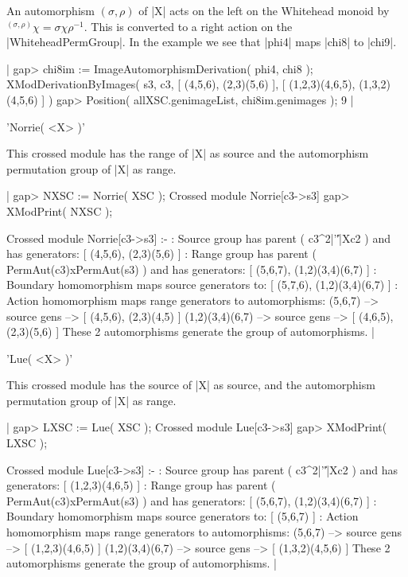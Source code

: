 {An automorphism $( \sigma, \rho )$ of |X| acts on the left on the Whitehead 
monoid by  $\mbox{}^{(\sigma,\rho)}\chi = \sigma \chi \rho^{-1}$.
This is converted to a right action on the |WhiteheadPermGroup|.
In the example we see that |phi4| maps |chi8| to |chi9|.

|    gap> chi8im := ImageAutomorphismDerivation( phi4, chi8 );
    XModDerivationByImages( s3, c3, [ (4,5,6), (2,3)(5,6) ], 
       [ (1,2,3)(4,6,5), (1,3,2)(4,5,6) ] )
    gap> Position( allXSC.genimageList, chi8im.genimages );
    9  |

%

'Norrie( <X> )'

This crossed module has the range of |X| as source and the automorphism
permutation group of |X| as range.

|    gap> NXSC := Norrie( XSC );
    Crossed module Norrie[c3->s3]
    gap> XModPrint( NXSC );

    Crossed module Norrie[c3->s3] :- 
    : Source group has parent ( c3^2|'\|'|Xc2 ) and has generators:
      [ (4,5,6), (2,3)(5,6) ]
    : Range group has parent ( PermAut(c3)xPermAut(s3) ) and has
        generators: [ (5,6,7), (1,2)(3,4)(6,7) ]
    : Boundary homomorphism maps source generators to:
      [ (5,7,6), (1,2)(3,4)(6,7) ]
    : Action homomorphism maps range generators to automorphisms:
      (5,6,7) --> { source gens --> [ (4,5,6), (2,3)(4,5) ] }
      (1,2)(3,4)(6,7) --> { source gens --> [ (4,6,5), (2,3)(5,6) ] }
      These 2 automorphisms generate the group of automorphisms.  |

%

'Lue( <X> )'

This crossed module has the source of |X| as source, and the automorphism
permutation group of |X| as range. 

|    gap> LXSC := Lue( XSC );
    Crossed module Lue[c3->s3]
    gap> XModPrint( LXSC );

    Crossed module Lue[c3->s3] :- 
    : Source group has parent ( c3^2|'\|'|Xc2 ) and has generators:
      [ (1,2,3)(4,6,5) ]
    : Range group has parent ( PermAut(c3)xPermAut(s3) ) and has
        generators: [ (5,6,7), (1,2)(3,4)(6,7) ]
    : Boundary homomorphism maps source generators to:
      [ (5,6,7) ]
    : Action homomorphism maps range generators to automorphisms:
      (5,6,7) --> { source gens --> [ (1,2,3)(4,6,5) ] }
      (1,2)(3,4)(6,7) --> { source gens --> [ (1,3,2)(4,5,6) ] }
      These 2 automorphisms generate the group of automorphisms.  |

}
